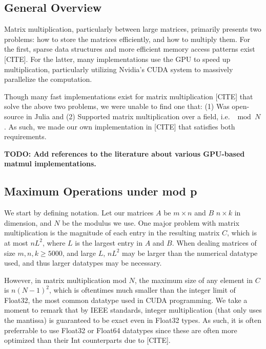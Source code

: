 



\subsection{General Overview}

Matrix multiplication, particularly between large matrices, primarily presents two problems: how to store the matrices efficiently, and how to multiply them. For the first, sparse data structures and more efficient memory access patterns exist [CITE]. For the latter, many implementations use the GPU to speed up multiplication, particularly utilizing Nvidia's CUDA system to massively parallelize the computation.

Though many fast implementations exist for matrix multiplication [CITE] that solve the above two problems, we were unable to find one that: (1) Was open-source in Julia and (2) Supported matrix multiplication over a field, i.e. $\mod N$. As such, we made our own implementation in [CITE] that satisfies both requirements.

\textbf{TODO: Add references to the literature about various GPU-based matmul implementations.}

\subsection{Maximum Operations under mod p}

We start by defining notation. Let our matrices $A$ be $m \times n$ and $B$ $n \times k$ in dimension, and $N$ be the modulus we use. One major problem with matrix multiplication is the magnitude of each entry in the resulting matrix $C$, which is at most $n L^2$, where $L$ is the largest entry in $A$ and $B$. When dealing matrices of size $m,n,k \geq 5000$, and large $L$, $n L^2$ may be larger than the numerical datatype used, and thus larger datatypes may be necessary.

However, in matrix multiplication mod $N$, the maximum size of any element in $C$ is $n (N-1)^2$, which is oftentimes much smaller than the integer limit of Float32, the most common datatype used in CUDA programming. We take a moment to remark that by IEEE standards, integer multiplication (that only uses the mantissa) is guaranteed to be exact even in Float32 types. As such, it is often preferrable to use Float32 or Float64 datatypes since these are often more optimized than their Int counterparts due to [CITE].


